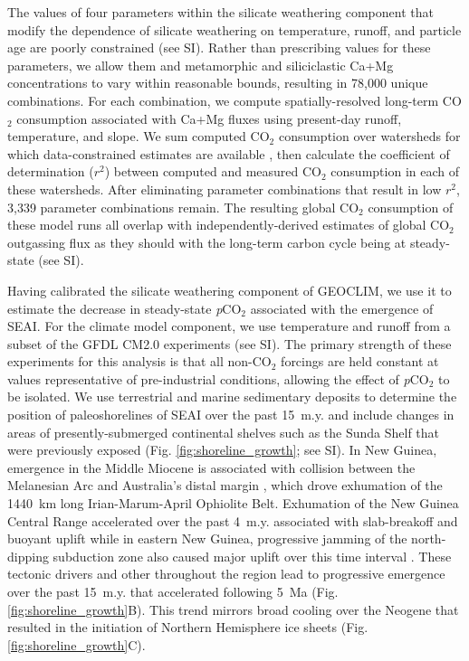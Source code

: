\documentclass[11pt,letterpaper]{article}
\newcommand{\pCOtwo}{\textit{p}CO$_{2}$\xspace}
\newcommand{\COtwo}{CO$_{2}$\xspace}
\begin{document}
The values of four parameters within the silicate weathering component \cite{Gabet2009a, West2012a, Maffre2018a} that modify the dependence of silicate weathering on temperature, runoff, and particle age are poorly constrained (see SI). Rather than prescribing values for these parameters, we allow them and metamorphic and siliciclastic Ca+Mg concentrations to vary within reasonable bounds, resulting in 78,000 unique combinations. For each combination, we compute spatially-resolved long-term \COtwo consumption associated with Ca+Mg fluxes using present-day runoff, temperature, and slope. We sum computed \COtwo consumption over watersheds for which data-constrained estimates are available \cite{Gaillardet1999a, Moquet2018a}, then calculate the coefficient of determination ($r^{2}$) between computed and measured \COtwo consumption in each of these watersheds. After eliminating parameter combinations that result in low $r^{2}$, 3,339 parameter combinations remain. The resulting global \COtwo consumption of these model runs all overlap with independently-derived estimates of global \COtwo outgassing flux \cite{Gerlach2011a} as they should with the long-term carbon cycle being at steady-state (see SI).

Having calibrated the silicate weathering component of GEOCLIM, we use it to estimate the decrease in steady-state \pCOtwo associated with the emergence of SEAI. For the climate model component, we use temperature and runoff from a subset of the GFDL CM2.0 experiments \cite{Delworth2006a, Delworth2006b} (see SI). The primary strength of these experiments for this analysis is that all non-\COtwo forcings are held constant at values representative of pre-industrial conditions, allowing the effect of \pCOtwo to be isolated. We use terrestrial and marine sedimentary deposits to determine the position of paleoshorelines of SEAI over the past 15~m.y. and include changes in areas of presently-submerged continental shelves such as the Sunda Shelf that were previously exposed (Fig. \ref{fig:shoreline_growth}; see SI). In New Guinea, emergence in the Middle Miocene is associated with collision between the Melanesian Arc and Australia's distal margin \cite{vanUfford2005a, Cloos2005a, Baldwin2012a}, which drove exhumation of the 1440~km long Irian-Marum-April Ophiolite Belt. Exhumation of the New Guinea Central Range accelerated over the past 4~m.y. associated with slab-breakoff and buoyant uplift \cite{Cloos2005a} while in eastern New Guinea, progressive jamming of the north-dipping subduction zone also caused major uplift over this time interval \cite{vanUfford2005a}. These tectonic drivers and other throughout the region lead to progressive emergence over the past 15~m.y. that accelerated following 5~Ma (Fig. \ref{fig:shoreline_growth}B). This trend mirrors broad cooling over the Neogene that resulted in the initiation of Northern Hemisphere ice sheets (Fig. \ref{fig:shoreline_growth}C).
\end{document}

